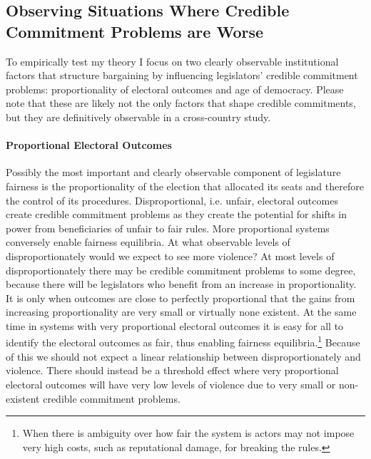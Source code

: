 \documentclass[a4paper]{article}\usepackage[]{graphicx}\usepackage[]{color}
\begin{document}
\subsection{Observing Situations Where Credible Commitment Problems are Worse}

To empirically test my theory I focus on two clearly observable institutional factors that structure bargaining by influencing legislators' credible commitment problems: proportionality of electoral outcomes and age of democracy. Please note that these are likely not the only factors that shape credible commitments, but they are definitively observable in a cross-country study.

\paragraph{Proportional Electoral Outcomes}

Possibly the most important and clearly observable component of legislature fairness is the proportionality of the election that allocated its seats and therefore the control of its procedures. Disproportional, i.e. unfair, electoral outcomes create credible commitment problems as they create the potential for shifts in power from beneficiaries of unfair to fair rules. More proportional systems conversely enable fairness equilibria. At what observable levels of disproportionately would we expect to see more violence? At most levels of disproportionately there may be credible commitment problems to some degree, because there will be legislators who benefit from an increase in proportionality. It is only when outcomes are close to perfectly proportional that the gains from increasing proportionality are very small or virtually none existent. At the same time in systems with very proportional electoral outcomes it is easy for all to identify the electoral outcomes as fair, thus enabling fairness equilibria.\footnote{When there is ambiguity over how fair the system is actors may not impose very high costs, such as reputational damage, for breaking the rules.} Because of this we should not expect a linear relationship between disproportionately and violence. There should instead be a threshold effect where very proportional electoral outcomes will have very low levels of violence due to very small or non-existent credible commitment problems.
\end{document}
